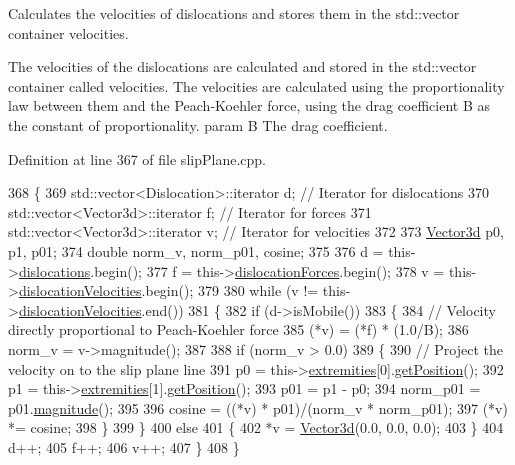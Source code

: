 Calculates the velocities of dislocations and stores them in the std\-::vector container velocities. 

The velocities of the dislocations are calculated and stored in the std\-::vector container called velocities. The velocities are calculated using the proportionality law between them and the Peach-\/\-Koehler force, using the drag coefficient B as the constant of proportionality. param B The drag coefficient. 

Definition at line 367 of file slip\-Plane.\-cpp.


\begin{DoxyCode}
368  \{
369    std::vector<Dislocation>::iterator d;  \textcolor{comment}{// Iterator for dislocations}
370    std::vector<Vector3d>::iterator f;     \textcolor{comment}{// Iterator for forces}
371    std::vector<Vector3d>::iterator v;     \textcolor{comment}{// Iterator for velocities}
372 
373    \hyperlink{classVector3d}{Vector3d} p0, p1, p01;
374    \textcolor{keywordtype}{double} norm\_v, norm\_p01, cosine;
375 
376    d = this->\hyperlink{classSlipPlane_ad92c7c409f7e161db449528389180910}{dislocations}.begin();
377    f = this->\hyperlink{classSlipPlane_a2a74ae1f66a59e53a3ca0c9b81b28f7d}{dislocationForces}.begin();
378    v = this->\hyperlink{classSlipPlane_a107a3883169bf918664cb4e4fd4bd72c}{dislocationVelocities}.begin();
379 
380    \textcolor{keywordflow}{while} (v != this->\hyperlink{classSlipPlane_a107a3883169bf918664cb4e4fd4bd72c}{dislocationVelocities}.end())
381      \{
382        \textcolor{keywordflow}{if} (d->isMobile())
383          \{
384            \textcolor{comment}{// Velocity directly proportional to Peach-Koehler force}
385            (*v) = (*f) * (1.0/B);
386            norm\_v = v->magnitude();
387 
388            \textcolor{keywordflow}{if} (norm\_v > 0.0)
389              \{
390                \textcolor{comment}{// Project the velocity on to the slip plane line}
391                p0 = this->\hyperlink{classSlipPlane_abbdbe6ed805faf3777b54ff55a9c089c}{extremities}[0].\hyperlink{classDefect_a2bfcc6736a19eb9c4c8803ea0ea1e3f7}{getPosition}();
392                p1 = this->\hyperlink{classSlipPlane_abbdbe6ed805faf3777b54ff55a9c089c}{extremities}[1].\hyperlink{classDefect_a2bfcc6736a19eb9c4c8803ea0ea1e3f7}{getPosition}();
393                p01 = p1 - p0;
394                norm\_p01 = p01.\hyperlink{classVector3d_adeda019b2d7ee805dece85650bdf6ed6}{magnitude}();
395            
396                cosine = ((*v) * p01)/(norm\_v * norm\_p01);
397                (*v) *= cosine;
398              \}
399          \}
400        \textcolor{keywordflow}{else}
401          \{
402            *v = \hyperlink{classVector3d}{Vector3d}(0.0, 0.0, 0.0);
403          \}
404        d++;
405        f++;
406        v++;
407      \}
408  \}
\end{DoxyCode}
